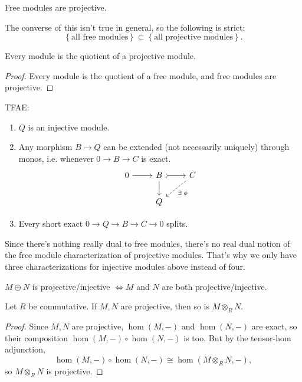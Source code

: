 \documentclass[twoside,10pt]{report}
\begin{document}
\begin{cor}
	Free modules are projective.
\end{cor}

The converse of this isn't true in general, so the following is strict:
\[
	\left\{ \text{all free modules} \right\} \subset \left\{ \text{all projective modules} \right\}.
\] 

\begin{cor}
Every module is the quotient of a projective module.
\end{cor}

\begin{proof}
	Every module is the quotient of a free module, and free modules are projective.
\end{proof}

\begin{thrm}
	TFAE:
	\begin{enumerate}
		\item $Q$ is an injective module.
		\item Any morphism $B\to Q$ can be extended (not necessarily uniquely) through monos, i.e. whenever $0\to B\to C$ is exact.
			\[
			\begin{tikzcd}
				0 \rar & B \rar[tail]\dar & C \arrow[dl,dashed,"\exists\;\phi"] \\
				       & Q
			\end{tikzcd}
			\] 
		\item Every short exact $0\to Q\to B\to C\to 0$ splits.
	\end{enumerate}
\end{thrm}

Since there's nothing really dual to free modules, there's no real dual notion of the free module characterization of projective modules. That's why we only have three characterizations for injective modules above instead of four.

\begin{prop}
$M \oplus N$ is projective/injective $\iff M$ and $N$ are both projective/injective.
\end{prop}

\begin{prop}
	Let $R$ be commutative. If $M,N$ are projective, then so is $M\otimes_{R}N$.
\end{prop}
\begin{proof}
	Since $M,N$ are projective, $\hom(M,-)$ and $\hom(N,-)$ are exact, so their composition $\hom(M,-)\circ \hom(N,-)$ is too. But by the tensor-hom adjunction,
	\[
		\hom(M,-)\circ \hom(N,-) \cong \hom(M\otimes_{R}N,-),
	\] so $M\otimes_{R}N$ is projective.
\end{proof}
\end{document}
